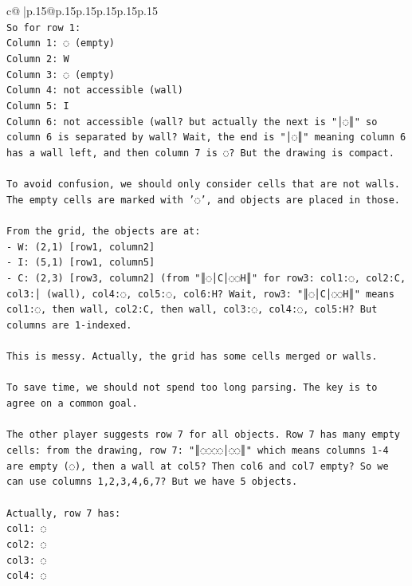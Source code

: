 \documentclass{article}
\begin{document}
{\begin{supertabular}{c@{$\;$}|p{.15\linewidth}@{}p{.15\linewidth}p{.15\linewidth}p{.15\linewidth}p{.15\linewidth}p{.15\linewidth}}
{{{\\ 
\texttt{So for row 1:} \\
\texttt{Column 1: ◌ (empty)} \\
\texttt{Column 2: W} \\
\texttt{Column 3: ◌ (empty)} \\
\texttt{Column 4: not accessible (wall)} \\
\texttt{Column 5: I} \\
\texttt{Column 6: not accessible (wall? but actually the next is "│◌║" so column 6 is separated by wall? Wait, the end is "│◌║" meaning column 6 has a wall left, and then column 7 is ◌? But the drawing is compact.} \\
\\ 
\texttt{To avoid confusion, we should only consider cells that are not walls. The empty cells are marked with '◌', and objects are placed in those.} \\
\\ 
\texttt{From the grid, the objects are at:} \\
\texttt{{-} W: (2,1)   {[}row1, column2{]}} \\
\texttt{{-} I: (5,1)   {[}row1, column5{]}} \\
\texttt{{-} C: (2,3)   {[}row3, column2{]} (from "║◌│C│◌◌H║" for row3: col1:◌, col2:C, col3:│ (wall), col4:◌, col5:◌, col6:H? Wait, row3: "║◌│C│◌◌H║" means col1:◌, then wall, col2:C, then wall, col3:◌, col4:◌, col5:H? But columns are 1{-}indexed.} \\
\\ 
\texttt{This is messy. Actually, the grid has some cells merged or walls.} \\
\\ 
\texttt{To save time, we should not spend too long parsing. The key is to agree on a common goal.} \\
\\ 
\texttt{The other player suggests row 7 for all objects. Row 7 has many empty cells: from the drawing, row 7: "║◌◌◌◌│◌◌║" which means columns 1{-}4 are empty (◌), then a wall at col5? Then col6 and col7 empty? So we can use columns 1,2,3,4,6,7? But we have 5 objects.} \\
\\ 
\texttt{Actually, row 7 has:} \\
\texttt{col1: ◌} \\
\texttt{col2: ◌} \\
\texttt{col3: ◌} \\
\texttt{col4: ◌} \\
}}}
\end{supertabular}}
\end{document}
